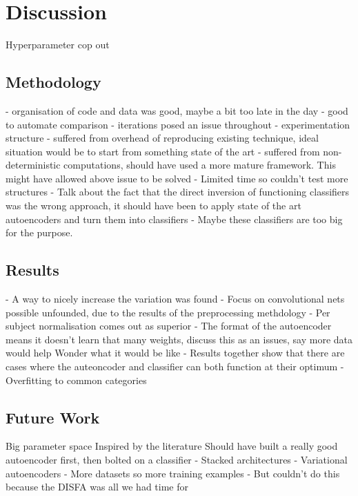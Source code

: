 \chapter{Discussion}
  Hyperparameter cop out
  \section{Methodology}
    - organisation of code and data was good, maybe a bit too late in the day
      - good to automate comparison
    - iterations posed an issue throughout
    - experimentation structure
    - suffered from overhead of reproducing existing technique, ideal situation would be to start from something state of the art
    - suffered from non-deterministic computations, should have used a more mature framework. This might have allowed
      above issue to be solved
    - Limited time so couldn't test more structures
    - Talk about the fact that the direct inversion of functioning classifiers was the wrong approach,
      it should have been to apply state of the art autoencoders and turn them into classifiers
    - Maybe these classifiers are too big for the purpose.
  \section{Results}
    - A way to nicely increase the variation was found
    - Focus on convolutional nets possible unfounded, due to the results of the preprocessing methdology
    - Per subject normalisation comes out as superior
    - The format of the autoencoder means it doesn't learn that many weights, discuss this as an issues, say more data would help
      Wonder what it would be like
    - Results together show that there are cases where the auteoncoder and classifier can both function at their optimum
    - Overfitting to common categories


  \section{Future Work}
    Big parameter space
    Inspired by the literature
    Should have built a really good autoencoder first, then bolted on a classifier
      - Stacked architectures
      - Variational autoencoders
      - More datasets so more training examples
        - But couldn't do this because the DISFA was all we had time for

